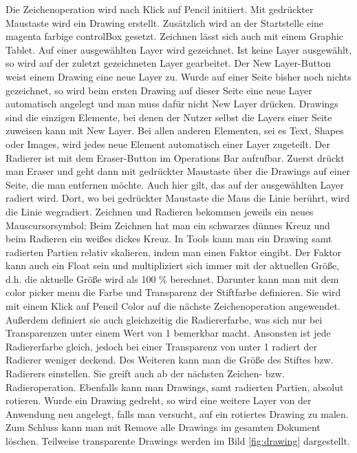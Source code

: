 Die Zeichenoperation wird nach Klick auf Pencil initiiert. Mit gedrückter Maustaste wird ein Drawing erstellt. Zusätzlich wird an der Startstelle eine magenta farbige controlBox gesetzt. Zeichnen lässt sich auch mit einem Graphic Tablet. Auf einer ausgewählten Layer wird gezeichnet. Ist keine Layer ausgewählt, so wird auf der zuletzt gezeichneten Layer gearbeitet. Der New Layer-Button weist einem Drawing eine neue Layer zu. Wurde auf einer Seite bisher noch nichts gezeichnet, so wird beim ersten Drawing auf dieser Seite eine neue Layer automatisch angelegt und man muss dafür nicht New Layer drücken. Drawings sind die einzigen Elemente, bei denen der Nutzer selbst die Layers einer Seite zuweisen kann mit New Layer. Bei allen anderen Elementen, sei es Text, Shapes oder Images, wird jedes neue Element automatisch einer Layer zugeteilt. Der Radierer ist mit dem Eraser-Button im Operations Bar aufrufbar. Zuerst drückt man Eraser und geht dann mit gedrückter Maustaste über die Drawings auf einer Seite, die man entfernen möchte. Auch hier gilt, das auf der ausgewählten Layer radiert wird. Dort, wo bei gedrückter Maustaste die Maus die Linie berührt, wird die Linie wegradiert. Zeichnen und Radieren bekommen jeweils ein neues Mauscursorsymbol: Beim Zeichnen hat man ein schwarzes dünnes Kreuz und beim Radieren ein weißes dickes Kreuz. In Tools kann man ein Drawing samt radierten Partien relativ skalieren, indem man einen Faktor eingibt. Der Faktor kann auch ein Float sein und multipliziert sich immer mit der aktuellen Größe, d.h. die aktuelle Größe wird als 100 \% berechnet. Darunter kann man mit dem color picker menu die Farbe und Transparenz der Stiftfarbe definieren. Sie wird mit einem Klick auf Pencil Color auf die nächste Zeichenoperation angewendet. Außerdem definiert sie auch gleichzeitig die Radiererfarbe, was sich nur bei Transparenzen unter einem Wert von 1 bemerkbar macht. Ansonsten ist jede Radiererfarbe gleich, jedoch bei einer Transparenz von unter 1 radiert der Radierer weniger deckend. Des Weiteren kann man die Größe des Stiftes bzw. Radierers einstellen. Sie greift auch ab der nächsten Zeichen- bzw. Radieroperation. Ebenfalls kann man Drawings, samt radierten Partien, absolut rotieren. Wurde ein Drawing gedreht, so wird eine weitere Layer von der Anwendung neu angelegt, falls man versucht, auf ein rotiertes Drawing zu malen. Zum Schluss kann man mit Remove alle Drawings im gesamten Dokument löschen. Teilweise transparente Drawings werden im Bild \ref{fig:drawing} dargestellt. 

